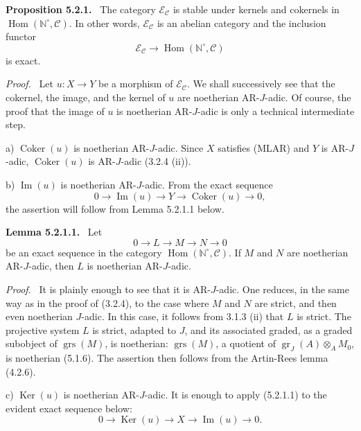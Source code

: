 \documentclass[11pt]{article}
\newenvironment{statement}[1]{\par\medskip\noindent\textbf{#1.}\ }{\par\medskip}
\newenvironment{prooftext}[1][Proof]{\par\noindent\emph{#1.}\ }{\par\medskip}
\DeclareMathOperator{\Hom}{Hom}
\providecommand{\Ker}{\operatorname{Ker}}
\providecommand{\Coker}{\operatorname{Coker}}
\providecommand{\gr}{\operatorname{gr}}
\providecommand{\Hom}{\operatorname{Hom}}
\providecommand{\Im}{\operatorname{Im}}
\providecommand{\Ker}{\operatorname{Ker}}
\providecommand{\Coker}{\operatorname{Coker}}
\providecommand{\gr}{\operatorname{gr}}
\renewcommand{\Im}{\operatorname{Im}}
\providecommand{\gr}{\operatorname{gr}}
\providecommand{\grs}{\operatorname{grs}}
\providecommand{\Ker}{\operatorname{Ker}}
\providecommand{\Coker}{\operatorname{Coker}}
\providecommand{\Im}{\operatorname{Im}}
\providecommand{\Hom}{\operatorname{Hom}}
\begin{document}
\begin{statement}{Proposition 5.2.1}
The category \(\mathcal E_{\mathcal C}\) is stable under kernels and cokernels in \(\Hom(\mathbb N^\circ,\mathcal C)\). In other words, \(\mathcal E_{\mathcal C}\) is an abelian category and the inclusion functor
\[
\mathcal E_{\mathcal C}\longrightarrow \Hom(\mathbb N^\circ,\mathcal C)
\]
is exact.
\end{statement}

\begin{prooftext}
Let \(u:X\to Y\) be a morphism of \(\mathcal E_{\mathcal C}\). We shall successively see that the cokernel, the image, and the kernel of \(u\) are noetherian AR-\(J\)-adic. Of course, the proof that the image of \(u\) is noetherian AR-\(J\)-adic is only a technical intermediate step.

a) \(\Coker(u)\) is noetherian AR-\(J\)-adic. Since \(X\) satisfies (MLAR) and \(Y\) is AR-\(J\)-adic, \(\Coker(u)\) is AR-\(J\)-adic (3.2.4 (ii)).

b) \(\Im(u)\) is noetherian AR-\(J\)-adic. From the exact sequence
\[
0\longrightarrow \Im(u)\longrightarrow Y\longrightarrow \Coker(u)\longrightarrow 0,
\]
the assertion will follow from Lemma 5.2.1.1 below.
\end{prooftext}

\begin{statement}{Lemma 5.2.1.1}
Let
\[
0\longrightarrow L\longrightarrow M\longrightarrow N\longrightarrow0
\]
be an exact sequence in the category \(\Hom(\mathbb N^\circ,\mathcal C)\). If \(M\) and \(N\) are noetherian AR-\(J\)-adic, then \(L\) is noetherian AR-\(J\)-adic.
\end{statement}

\begin{prooftext}
It is plainly enough to see that it is AR-\(J\)-adic. One reduces, in the same way as in the proof of (3.2.4), to the case where \(M\) and \(N\) are strict, and then even noetherian \(J\)-adic. In this case, it follows from 3.1.3 (ii) that \(L\) is strict. The projective system \(L\) is strict, adapted to \(J\), and its associated graded, as a graded subobject of \(\grs(M)\), is noetherian: \(\grs(M)\), a quotient of \(\gr_J(A)\otimes_A M_0\), is noetherian (5.1.6). The assertion then follows from the Artin-Rees lemma (4.2.6).
\end{prooftext}

c) \(\Ker(u)\) is noetherian AR-\(J\)-adic. It is enough to apply (5.2.1.1) to the evident exact sequence below:
\[
0\longrightarrow \Ker(u)\longrightarrow X\longrightarrow \Im(u)\longrightarrow0.
\]
\end{document}
